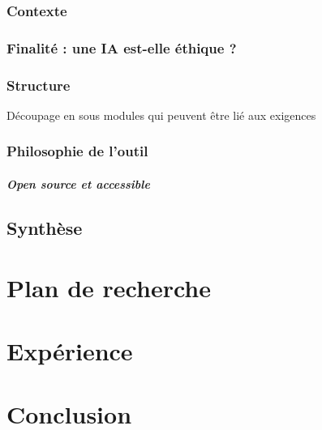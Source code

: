 \documentclass[10pt, french, a4paper]{report}
\begin{document}
\subsection{Contexte}

\subsection{Finalité : une IA est-elle éthique ?}

\subsection{Structure}

Découpage en sous modules qui peuvent être lié aux exigences

\subsection{Philosophie de l'outil}

\paragraph{Open source et accessible}


\section{Synthèse}


\newpage
\chapter{Plan de recherche}


\newpage
\chapter{Expérience}


\newpage
\chapter*{Conclusion}

\newpage
% 


\end{document}
